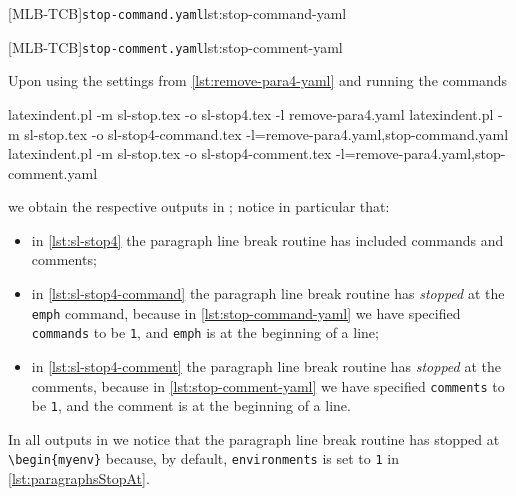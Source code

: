 	\begin{minipage}{.45\linewidth}
	\end{minipage}
	\hfill
	\begin{minipage}{.49\linewidth}
		[MLB-TCB]{\texttt{stop-command.yaml}}{lst:stop-command-yaml}

		[MLB-TCB]{\texttt{stop-comment.yaml}}{lst:stop-comment-yaml}
	\end{minipage}

	Upon using the settings from \vref{lst:remove-para4-yaml} and running the commands
	\begin{widepage}
		\begin{commandshell}
latexindent.pl -m sl-stop.tex -o sl-stop4.tex -l remove-para4.yaml
latexindent.pl -m sl-stop.tex -o sl-stop4-command.tex -l=remove-para4.yaml,stop-command.yaml
latexindent.pl -m sl-stop.tex -o sl-stop4-comment.tex -l=remove-para4.yaml,stop-comment.yaml
    \end{commandshell}
	\end{widepage}
	we obtain the respective outputs in ; notice in particular
	that:
	\begin{itemize}
		\item in \cref{lst:sl-stop4} the paragraph line break routine has included commands and
		      comments;
		\item in \cref{lst:sl-stop4-command} the paragraph line break routine has
		      \emph{stopped} at the \texttt{emph} command, because in
		      \cref{lst:stop-command-yaml} we have specified \texttt{commands} to be
		      \texttt{1}, and \texttt{emph} is at the beginning of a
		      line;
		\item in \cref{lst:sl-stop4-comment} the paragraph line break routine has
		      \emph{stopped} at the comments, because in \cref{lst:stop-comment-yaml} we
		      have specified \texttt{comments} to be \texttt{1}, and the
		      comment is at the beginning of a line.
	\end{itemize}
	In all outputs in  we notice that the paragraph line break
	routine has stopped at \lstinline!\begin{myenv}! because, by default,
	\texttt{environments} is set to \texttt{1} in
	\vref{lst:paragraphsStopAt}.

